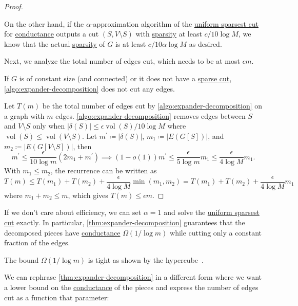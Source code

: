\begin{proof}
\begin{explanation}
		On the other hand, if the \(\alpha \)-approximation algorithm of the \hyperref[prb:sparsest-cut]{uniform sparsest cut} for \hyperref[def:conductance]{conductance} outputs a cut \((S, V\setminus S)\) with \hyperref[def:sparsity]{sparsity} at least \(c / 10\log M\), we know that the actual \hyperref[def:sparsity]{sparsity} of \(G\) is at least \(c / 10 \alpha \log M\) as desired.
	\end{explanation}

	Next, we analyze the total number of edges cut, which needs to be at most \(\epsilon m\).
	\begin{intuition}
		If \(G\) is of constant size (and connected) or it does not have a \hyperref[prb:sparsest-cut]{sparse cut}, \autoref{algo:expander-decomposition} does not cut any edges.
	\end{intuition}
	Let \(T(m)\) be the total number of edges cut by \autoref{algo:expander-decomposition} on a graph with \(m\) edges. \autoref{algo:expander-decomposition} removes edges between \(S\) and \(V\setminus S\) only when \(\lvert \delta (S) \rvert \leq \epsilon \operatorname{vol}(S) / 10 \log M \) where \(\operatorname{vol}(S) \leq \operatorname{vol}(V \setminus S) \). Let \(m^{\prime} \coloneqq \lvert \delta (S) \rvert \), \(m_1 \coloneqq \lvert E(G[S]) \rvert \), and \(m_2 \coloneqq \lvert E(G[V\setminus S]) \rvert\), then
	\[
		m^{\prime}
		\leq \frac{\epsilon }{10 \log m} (2m_1 + m^{\prime} )
		\implies (1 - o(1)) m^{\prime} \leq \frac{\epsilon }{5 \log m} m_1
		\leq \frac{\epsilon }{4 \log M} m_1.
	\]
	With \(m_1 \leq m_2\), the recurrence can be written as
	\[
		T(m)
		\leq T(m_1) + T(m_2) + \frac{\epsilon }{4 \log M} \min (m_1, m_2)
		= T(m_1) + T(m_2) + \frac{\epsilon }{4 \log M} m_1
	\]
	where \(m_1 + m_2 \leq m\), which gives \(T(m) \leq \epsilon m\).
\end{proof}

If we don't care about efficiency, we can set \(\alpha = 1\) and solve the \hyperref[prb:sparsest-cut]{uniform sparsest cut} exactly. In particular, \autoref{thm:expander-decomposition} guarantees that the decomposed pieces have \hyperref[def:conductance]{conductance} \(\Omega (1 / \log m)\) while cutting only a constant fraction of the edges.

\begin{note}
	The bound \(\Omega (1 / \log m)\) is tight as shown by the hypercube~\cite{alev2017graph}.
\end{note}

We can rephrase \autoref{thm:expander-decomposition} in a different form where we want a lower bound on the \hyperref[def:conductance]{conductance} of the pieces and express the number of edges cut as a function that parameter:

